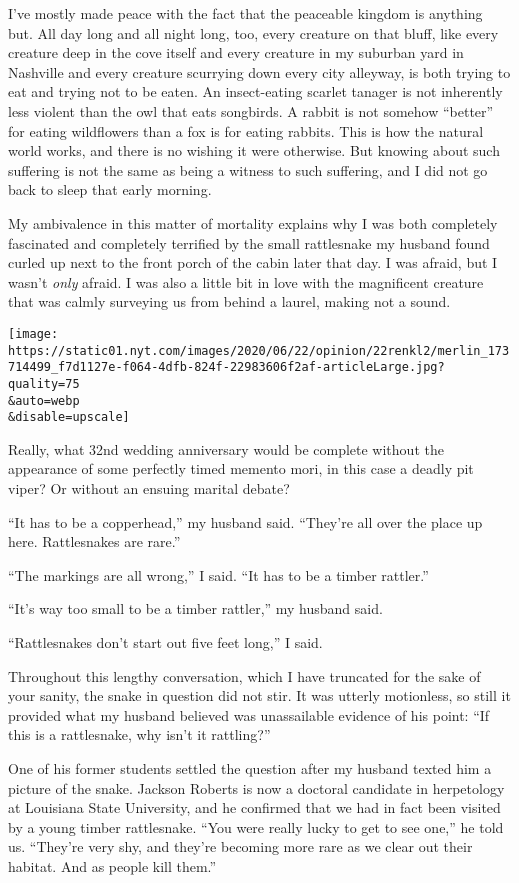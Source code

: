 I've mostly made peace with the fact that the peaceable kingdom is
anything but. All day long and all night long, too, every creature on
that bluff, like every creature deep in the cove itself and every
creature in my suburban yard in Nashville and every creature scurrying
down every city alleyway, is both trying to eat and trying not to be
eaten. An insect-eating scarlet tanager is not inherently less violent
than the owl that eats songbirds. A rabbit is not somehow ``better'' for
eating wildflowers than a fox is for eating rabbits. This is how the
natural world works, and there is no wishing it were otherwise. But
knowing about such suffering is not the same as being a witness to such
suffering, and I did not go back to sleep that early morning.

My ambivalence in this matter of mortality explains why I was both
completely fascinated and completely terrified by the small rattlesnake
my husband found curled up next to the front porch of the cabin later
that day. I was afraid, but I wasn't \emph{only} afraid. I was also a
little bit in love with the magnificent creature that was calmly
surveying us from behind a laurel, making not a sound.

\texttt{[image: https://static01.nyt.com/images/2020/06/22/opinion/22renkl2/merlin\_173714499\_f7d1127e-f064-4dfb-824f-22983606f2af-articleLarge.jpg?quality=75\\\&auto=webp\\\&disable=upscale]}

Really, what 32nd wedding anniversary would be complete without the
appearance of some perfectly timed memento mori, in this case a deadly
pit viper? Or without an ensuing marital debate?

``It has to be a copperhead,'' my husband said. ``They're all over the
place up here. Rattlesnakes are rare.''

``The markings are all wrong,'' I said. ``It has to be a timber
rattler.''

``It's way too small to be a timber rattler,'' my husband said.

``Rattlesnakes don't start out five feet long,'' I said.

Throughout this lengthy conversation, which I have truncated for the
sake of your sanity, the snake in question did not stir. It was utterly
motionless, so still it provided what my husband believed was
unassailable evidence of his point: ``If this is a rattlesnake, why
isn't it rattling?''

One of his former students settled the question after my husband texted
him a picture of the snake. Jackson Roberts is now a doctoral candidate
in herpetology at Louisiana State University, and he confirmed that we
had in fact been visited by a young timber rattlesnake. ``You were
really lucky to get to see one,'' he told us. ``They're very shy, and
they're becoming more rare as we clear out their habitat. And as people
kill them.''

